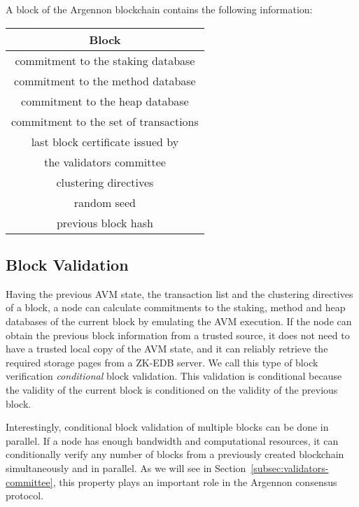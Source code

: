 A block of the Argennon blockchain contains the following information:

\begin{center}
    \begin{tabular}{||c||}
        \hline
        \textbf{Block} \\ [0.5ex]
        \hline\hline
        commitment to the staking database            \\ [1.2ex]
        commitment to the method database             \\ [1.2ex]
        commitment to the heap database               \\ [1.2ex]
        commitment to the set of transactions         \\ [1.2ex]
        last block certificate issued by         \\
        the validators committee                      \\ [1.2ex]
        clustering directives                         \\ [1.2ex]
        random seed                                   \\ [1.2ex]
        previous block hash                           \\ [1.2ex]
        \hline
    \end{tabular}
\end{center}

\subsection{Block Validation}\label{subsec:block-validation}

Having the previous AVM state, the transaction list and the clustering directives of a block, a node can calculate
commitments to the staking, method and heap databases of the current block by emulating the AVM execution. If the
node can obtain the previous block information from a trusted source, it does not need to have a trusted local
copy of the AVM state,
and it can reliably retrieve the required storage pages from a ZK-EDB server. We call this type of block verification
\emph{conditional} block validation. This validation is conditional because the validity of the current block is
conditioned on the validity of the previous block.

Interestingly, conditional block validation of multiple blocks can be done in parallel. If a node has enough bandwidth
and computational resources, it can conditionally verify any number of blocks from a previously created blockchain
simultaneously and in parallel. As we will see in Section~\ref{subsec:validators-committee}, this property plays an
important role in the Argennon consensus protocol.

